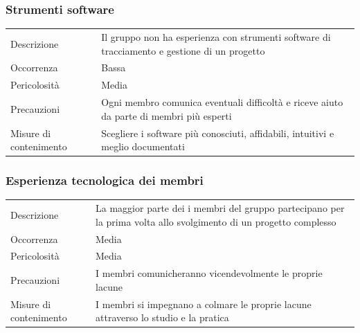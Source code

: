 \documentclass{article}
\begin{document}
\subsubsection{Strumenti software}
\begin{center}
\begin{tabular}{P{10em} P{20em}} 
     Descrizione & Il gruppo non ha esperienza con strumenti software di tracciamento e gestione di un progetto\\ 
    Occorrenza & Bassa\\
    Pericolosità & Media \\
    Precauzioni & Ogni membro comunica eventuali difficoltà e riceve aiuto da parte di membri più esperti \\
    Misure di contenimento & Scegliere i software più conosciuti, affidabili, intuitivi e meglio documentati \\
\end{tabular}
\end{center}

\subsubsection{Esperienza tecnologica dei membri}
\begin{center}
\begin{tabular}{P{10em} P{20em}} 
     Descrizione & La maggior parte dei i membri del gruppo partecipano per la prima volta allo svolgimento di un progetto complesso \\ 
    Occorrenza & Media\\
    Pericolosità & Media \\
    Precauzioni & I membri comunicheranno vicendevolmente le proprie lacune\\
    Misure di contenimento & I membri si impegnano a colmare le proprie lacune attraverso lo studio e la pratica \\
\end{tabular}
\end{center}
\end{document}
